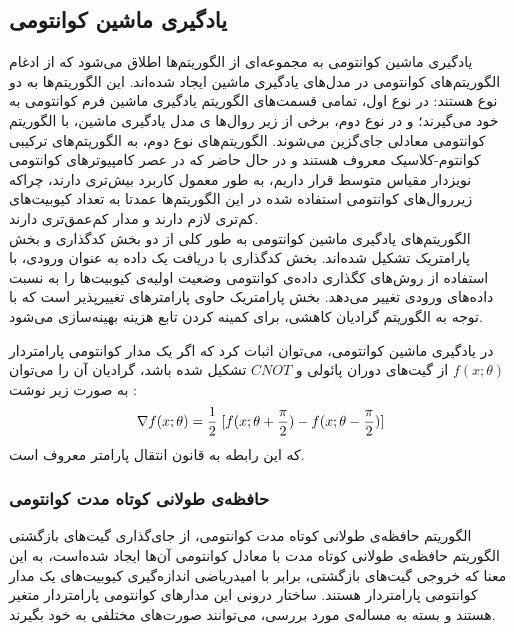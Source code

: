 \subsection{یادگیری ماشین کوانتومی}

یادگیری ماشین کوانتومی به مجموعه‌ای از الگوریتم‌ها اطلاق می‌شود که از ادغام الگوریتم‌های کوانتومی در مدل‌های یادگیری ماشین ایجاد شده‌اند. این الگوریتم‌ها به دو نوع هستند: در نوع اول، تمامی  قسمت‌های الگوریتم یادگیری ماشین فرم کوانتومی به خود می‌گیرند؛ و در نوع دوم، برخی از زیر روال‌ها
ی مدل یادگیری ماشین، با الگوریتم کوانتومی معادلی جای‌گزین می‌شوند. الگوریتم‌های نوع دوم، به الگوریتم‌های ترکیبی کوانتوم-کلاسیک معروف هستند و در حال حاضر که در عصر
کامپیوترهای کوانتومی نویزدار مقیاس متوسط
قرار داریم، به طور معمول کاربرد بیش‌تری دارند، چراکه زیرروال‌های کوانتومی استفاده شده در این الگوریتم‌ها عمدتا به تعداد کیوبیت‌های کم‌تری لازم دارند و مدار کم‌عمق‌تری دارند. \\

الگوریتم‌های یادگیری ماشین کوانتومی به طور کلی از دو بخش کدگذاری
و بخش پارامتریک
تشکیل شده‌اند.
بخش کدگذاری با دریافت یک داده به عنوان ورودی، با استفاده از روش‌های کگذاری داده‌ی کوانتومی
وضعیت اولیه‌ی کیوبیت‌ها را به نسبت داده‌های ورودی تغییر می‌دهد.
بخش پارامتریک حاوی پارامترهای تغییرپذیر است که با توجه به الگوریتم گرادیان کاهشی، برای کمینه کردن تابع هزینه بهینه‌سازی می‌شود.

در یادگیری ماشین کوانتومی، می‌توان اثبات کرد که اگر یک مدار کوانتومی پارامتردار
$f(x; \theta)$
از گیت‌های دوران پائولی و 
$CNOT$
تشکیل شده باشد، گرادیان آن را می‌توان به صورت زیر نوشت
\cite{Mitarai}:
\begin{equation}
    \nabla f(x; \theta) 
    = \frac{1}{2} \hspace{1mm} [f(x;\theta + \frac{\pi}{2}) - f(x; \theta - \frac{\pi}{2})]
\end{equation}
\hsm
که این رابطه به قانون انتقال پارامتر
معروف است.

\subsubsection{حافظه‌ی طولانی کوتاه مدت کوانتومی} \label{sec:qlstm}
الگوریتم حافظه‌ی طولانی کوتاه مدت کوانتومی، از جای‌گذاری گیت‌های بازگشتی الگوریتم حافظه‌ی طولانی کوتاه مدت با معادل کوانتومی آن‌ها ایجاد شده‌است، به این معنا که خروجی گیت‌های بازگشتی، برابر با امیدریاضی اندازه‌گیری کیوبیت‌های یک مدار کوانتومی پارامتردار هستند. 
ساختار درونی این مدارهای کوانتومی پارامتردار متغیر هستند و بسته به مساله‌ی مورد بررسی، می‌توانند صورت‌های مختلفی به خود بگیرند.

